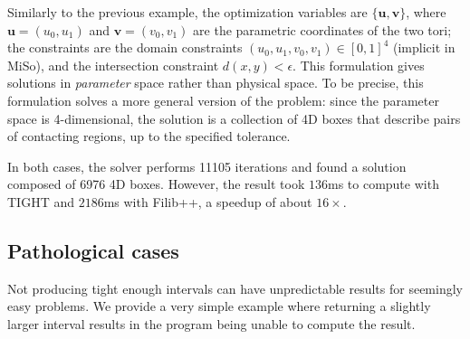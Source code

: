 Similarly to the previous example, the optimization variables are $\{\mathbf{u}, \mathbf{v}\}$, where $\mathbf{u}=(u_0, u_1)$ and $\mathbf{v}=(v_0, v_1)$ are the parametric coordinates of the two tori;
the constraints are the domain constraints $(u_0,u_1,v_0,v_1)\in[0,1]^4$ (implicit in MiSo), and the intersection constraint $d(x,y)<\epsilon$.
This formulation gives solutions in \emph{parameter} space rather than physical space. To be precise, this formulation solves a more general version of the problem: since the parameter space is 4-dimensional, the solution is a collection of 4D boxes that describe pairs of contacting regions, up to the specified tolerance.

In both cases, the solver performs 11105 iterations and found a solution composed of 6976 4D boxes. However, the result took $136$ms to compute with TIGHT and $2186$ms with Filib++, a speedup of about $16\times$.

\subsection{Pathological cases}
Not producing tight enough intervals can have unpredictable results for seemingly easy problems. We provide a very simple example where returning a slightly larger interval results in the program being unable to compute the result.

